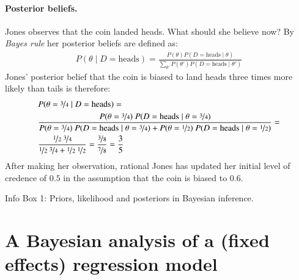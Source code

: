 \documentclass[nobib]{tufte-handout}
\begin{document}
\begin{InfoBox}[]
{\begin{minipage}{1.0\textwidth}
    \paragraph{Posterior beliefs.} Jones observes that the coin landed heads. What should she
    believe now? By \emph{Bayes rule} her posterior beliefs are defined as:
    \begin{align*}
      P(\theta \mid D = \text{heads}) = \frac{P(\theta) P(D = \text{heads} \mid \theta)}{\sum_{\theta'}P(\theta') P(D = \text{heads} \mid \theta')}
    \end{align*}
    Jones' posterior belief that the coin is biased to land heads three times more likely than tails is therefore:
    \begin{align*}
      & P(\theta = \nicefrac{3}{4} \mid D = \text{heads}) =  \\
      & \frac{P(\theta = \nicefrac{3}{4}) \ P(D = \text{heads} \mid \theta = \nicefrac{3}{4})}{P(\theta = \nicefrac{3}{4}) \ P(D = \text{heads} \mid \theta = \nicefrac{3}{4}) + P(\theta = \nicefrac{1}{2}) \ P(D = \text{heads} \mid \theta = \nicefrac{1}{2})} = \\
      & \frac{\nicefrac{1}{2} \ \nicefrac{3}{4}}{\nicefrac{1}{2} \ \nicefrac{3}{4} + \nicefrac{1}{2} \ \nicefrac{1}{2}} = \frac{\nicefrac{3}{8}}{\nicefrac{7}{8}} = \frac{3}{5} 
    \end{align*}
    After making her observation, rational Jones has updated her initial level of credence of $0.5$ in the assumption that the coin is biased to $0.6$.
    
  \end{minipage} \par
  } \par
  \begin{center}
    Info Box 1: Priors, likelihood and posteriors in Bayesian inference.
  \end{center}
\end{InfoBox}


\section{A Bayesian analysis of a (fixed effects) regression model}
\end{document}
